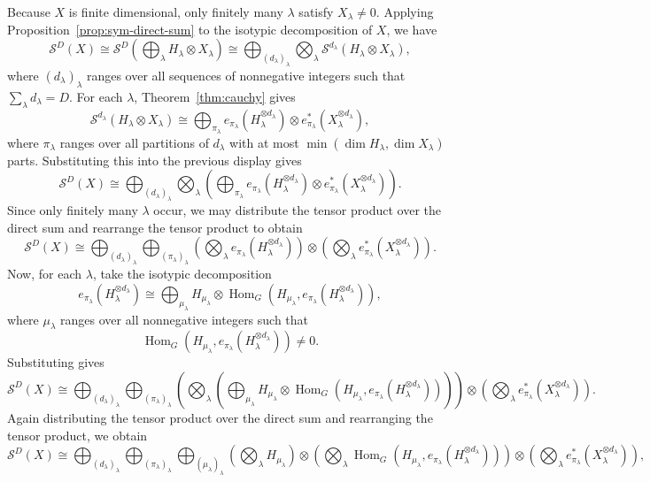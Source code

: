 \documentclass[11pt]{article}
\newcommand{\scS}{\mathcal{S}}
\newcommand{\HomG}[2]{\operatorname{Hom}_G\!\left(#1,#2\right)}
\theoremstyle{definition}
\begin{document}
Because $X$ is finite dimensional, only finitely many $\lambda$ satisfy $X_\lambda\neq 0$.
Applying Proposition~\ref{prop:sym-direct-sum} to the isotypic decomposition of $X$, we have
\[
  \scS^D(X)
  \cong
  \scS^D\!\left(\bigoplus_\lambda H_\lambda\otimes X_\lambda\right)
  \cong
  \bigoplus_{(d_\lambda)_\lambda}
  \bigotimes_\lambda
  \scS^{d_\lambda}(H_\lambda\otimes X_\lambda),
\]
where $(d_\lambda)_\lambda$ ranges over all sequences of nonnegative integers such that $\sum_\lambda d_\lambda=D$.
For each $\lambda$, Theorem~\ref{thm:cauchy} gives
\[
  \scS^{d_\lambda}(H_\lambda\otimes X_\lambda)
  \cong
  \bigoplus_{\pi_\lambda}
  e_{\pi_\lambda}(H_\lambda^{\otimes d_\lambda})\otimes e_{\pi_\lambda}^*(X_\lambda^{\otimes d_\lambda}),
\]
where $\pi_\lambda$ ranges over all partitions of $d_\lambda$ with at most $\min(\dim H_\lambda,\dim X_\lambda)$ parts.
Substituting this into the previous display gives
\[
  \scS^D(X)
  \cong
  \bigoplus_{(d_\lambda)_\lambda}
  \bigotimes_\lambda
  \left(
  \bigoplus_{\pi_\lambda}
  e_{\pi_\lambda}(H_\lambda^{\otimes d_\lambda})\otimes e_{\pi_\lambda}^*(X_\lambda^{\otimes d_\lambda})
  \right).
\]
Since only finitely many $\lambda$ occur, we may distribute the tensor product over the direct sum and rearrange the tensor product to obtain
\[
  \scS^D(X)
  \cong
  \bigoplus_{(d_\lambda)_\lambda}
  \bigoplus_{(\pi_\lambda)_\lambda}
  \left(\bigotimes_\lambda e_{\pi_\lambda}(H_\lambda^{\otimes d_\lambda})\right)
  \otimes
  \left(\bigotimes_\lambda e_{\pi_\lambda}^*(X_\lambda^{\otimes d_\lambda})\right).
\]
Now, for each $\lambda$, take the isotypic decomposition
\[
  e_{\pi_\lambda}(H_\lambda^{\otimes d_\lambda})
  \cong
  \bigoplus_{\mu_\lambda}
  H_{\mu_\lambda}\otimes \HomG{H_{\mu_\lambda}}{e_{\pi_\lambda}(H_\lambda^{\otimes d_\lambda})},
\]
where $\mu_\lambda$ ranges over all nonnegative integers such that
\[
  \HomG{H_{\mu_\lambda}}{e_{\pi_\lambda}(H_\lambda^{\otimes d_\lambda})}\neq 0.
\]
Substituting gives
\[
  \scS^D(X)
  \cong
  \bigoplus_{(d_\lambda)_\lambda}
  \bigoplus_{(\pi_\lambda)_\lambda}
  \left(\bigotimes_\lambda
  \left(
  \bigoplus_{\mu_\lambda}
  H_{\mu_\lambda}\otimes \HomG{H_{\mu_\lambda}}{e_{\pi_\lambda}(H_\lambda^{\otimes d_\lambda})}
  \right)\right)
  \otimes
  \left(\bigotimes_\lambda e_{\pi_\lambda}^*(X_\lambda^{\otimes d_\lambda})\right).
\]
Again distributing the tensor product over the direct sum and rearranging the tensor product, we obtain
\[
  \scS^D(X)
  \cong
  \bigoplus_{(d_\lambda)_\lambda}
  \bigoplus_{(\pi_\lambda)_\lambda}
  \bigoplus_{(\mu_\lambda)_\lambda}
  \left(\bigotimes_\lambda H_{\mu_\lambda}\right)
  \otimes
  \left(\bigotimes_\lambda \HomG{H_{\mu_\lambda}}{e_{\pi_\lambda}(H_\lambda^{\otimes d_\lambda})}\right)
  \otimes
  \left(\bigotimes_\lambda e_{\pi_\lambda}^*(X_\lambda^{\otimes d_\lambda})\right),
\]
\end{document}
